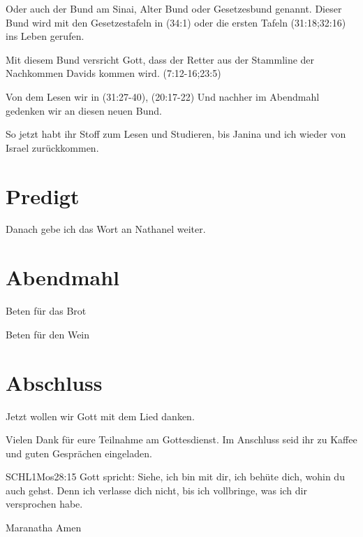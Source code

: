 \documentclass{mybib}
\begin{document}
\begin{spacing}{1.5}
\begin{block}
        Oder auch der Bund am Sinai, Alter Bund oder Gesetzesbund genannt. Dieser Bund wird mit den Gesetzestafeln in (34:1) oder die ersten Tafeln (31:18;32:16) ins Leben gerufen.
    \end{block}
    \begin{block}
        Mit diesem Bund versricht Gott, dass der Retter aus der Stammline der Nachkommen Davids kommen wird. (7:12-16;23:5)
    \end{block}
    \begin{block}
        Von dem Lesen wir in (31:27-40), (20:17-22)
        Und nachher im Abendmahl gedenken wir an diesen neuen Bund.
    \end{block}
    So jetzt habt ihr Stoff zum Lesen und Studieren, bis Janina und ich wieder von Israel zurückkommen.
\end{spacing}
\section{Predigt}

Danach gebe ich das Wort an Nathanel weiter.



\section{Abendmahl}

Beten für das Brot


Beten für den Wein


\section{Abschluss}

Jetzt wollen wir Gott mit dem Lied  danken.

Vielen Dank für eure Teilnahme am Gottesdienst. Im Anschluss seid ihr zu Kaffee und guten Gesprächen eingeladen.
\beten{}

\begin{bibelbox}{SCHL}{1Mos}{28:15}
Gott spricht: Siehe, ich bin mit dir,
ich behüte dich, wohin du auch gehst.
Denn ich verlasse dich nicht,
bis ich vollbringe, was ich dir versprochen habe.
\end{bibelbox}

Maranatha Amen
\end{document}
